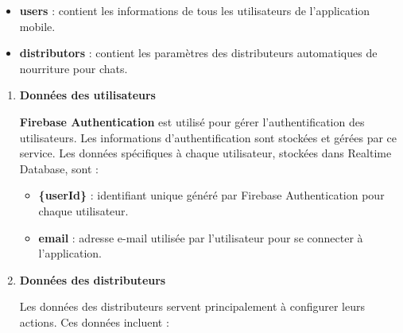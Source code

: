 \begin{itemize}
\item \textbf{users} : contient les informations de tous les utilisateurs de l'application mobile.
\item \textbf{distributors} : contient les paramètres des distributeurs automatiques de nourriture pour chats.
\end{itemize}

\begin{enumerate}[label=\alph*)]
\item \textbf{Données des utilisateurs} 

\textbf{Firebase Authentication} est utilisé pour gérer l'authentification des utilisateurs. Les informations d'authentification sont stockées et gérées par ce service. Les données spécifiques à chaque utilisateur, stockées dans Realtime Database, sont :

\begin{itemize}
\item \textbf{\{userId\}} : identifiant unique généré par Firebase Authentication pour chaque utilisateur.
\item \textbf{email} : adresse e-mail utilisée par l'utilisateur pour se connecter à l'application.
\end{itemize}

\item \textbf{Données des distributeurs} 

Les données des distributeurs servent principalement à configurer leurs actions. Ces données incluent :


\end{enumerate}
